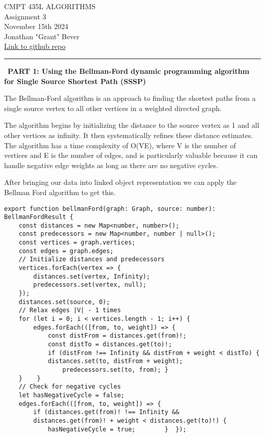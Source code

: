 \documentclass[12pt,letterpaper, onecolumn]{exam}
\begin{document}
\begingroup  
    \centering
    \LARGE CMPT 435L ALGORITHMS\\
    \LARGE Assignment 3\\[0.5em]
    \large November 15th 2024 \\[0.5em]
    \large Jonathan "Grant" Bever\\[0.5em]
    
    \small\href{https://github.com/Grant-Bever/CMPT435L_Algo}{Link to github repo}
    \par
\endgroup
\rule{\textwidth}{0.3pt}


\noindent\ \textbf{PART 1: Using the Bellman-Ford dynamic programming	algorithm for	Single Source Shortest Path (SSSP)	
}


\vspace{.5cm}

\centering 
The Bellman-Ford algorithm is an approach to finding the shortest paths from a single source vertex to all other vertices in a weighted directed graph. 

The algorithm begins by initializing the distance to the source vertex as 1 and all other vertices as infinity. It then systematically refines these distance estimates. The algorithm has a time complexity of O(VE), where V is the number of vertices and E is the number of edges, and is particularly valuable because it can handle negative edge weights as long as there are no negative cycles.

\vspace{.2cm}

After bringing our data into linked object representation we can apply the Bellman Ford algorithm to get this.

\begin{lstlisting}
export function bellmanFord(graph: Graph, source: number): BellmanFordResult {
    const distances = new Map<number, number>();
    const predecessors = new Map<number, number | null>();
    const vertices = graph.vertices;
    const edges = graph.edges;
    // Initialize distances and predecessors
    vertices.forEach(vertex => {
        distances.set(vertex, Infinity);
        predecessors.set(vertex, null);
    });
    distances.set(source, 0);
    // Relax edges |V| - 1 times
    for (let i = 0; i < vertices.length - 1; i++) {
        edges.forEach(([from, to, weight]) => {
            const distFrom = distances.get(from)!;
            const distTo = distances.get(to)!;
            if (distFrom !== Infinity && distFrom + weight < distTo) {
            distances.set(to, distFrom + weight);
                predecessors.set(to, from); } 
    }    }
    // Check for negative cycles
    let hasNegativeCycle = false;
    edges.forEach(([from, to, weight]) => {
        if (distances.get(from)! !== Infinity && 
        distances.get(from)! + weight < distances.get(to)!) {
            hasNegativeCycle = true;        }  });

\end{lstlisting}
\end{document}
